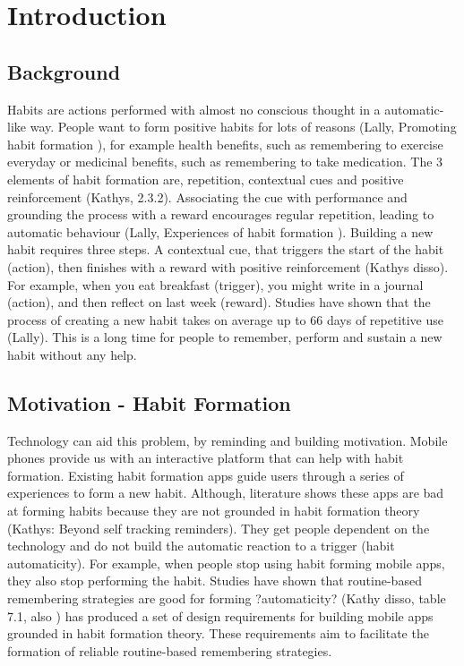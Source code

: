 
\section{Introduction}

\subsection*{Background}
Habits are actions performed with almost no conscious thought in a automatic-like way. People want to form positive habits for lots of reasons (Lally, Promoting habit formation \cite{article_promoting_habit_formation}), for example health benefits, such as remembering to exercise everyday or medicinal benefits, such as remembering to take medication. The 3 elements of habit formation are, repetition, contextual cues and positive reinforcement (Kathys, 2.3.2). Associating the cue with performance and grounding the process with a reward encourages regular repetition, leading to automatic behaviour (Lally, Experiences of habit formation \cite{article_experiences_of_habit_formation}). Building a new habit requires three steps. A contextual cue, that triggers the start of the habit (action), then finishes with a reward with positive reinforcement (Kathys disso). For example, when you eat breakfast (trigger), you might write in a journal (action), and then reflect on last week (reward). Studies have shown that the process of creating a new habit takes on average up to 66 days of repetitive use (Lally). This is a long time for people to remember, perform and sustain a new habit without any help.

\subsection*{Motivation - Habit Formation}
Technology can aid this problem, by reminding and building motivation. Mobile phones provide us with an interactive platform that can help with habit formation. Existing habit formation apps guide users through a series of experiences to form a new habit. Although, literature shows these apps are bad at forming habits because they are not grounded in habit formation theory (Kathys: Beyond self tracking reminders). They get people dependent on the technology and do not build the automatic reaction to a trigger (habit automaticity). For example, when people stop using habit forming mobile apps, they also stop performing the habit.\newline
\newline
Studies have shown that routine-based remembering strategies are good for forming ?automaticity? (Kathy disso, table 7.1, also \cite{article_dont_forget_your_pill}) has produced a set of design requirements for building mobile apps grounded in habit formation theory. These requirements aim to facilitate the formation of reliable routine-based remembering strategies.


